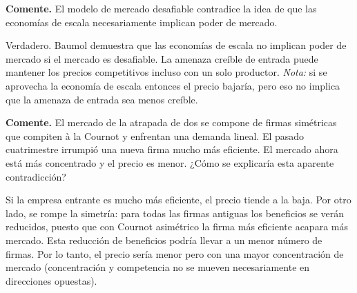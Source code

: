 \question \textbf{Comente.} El modelo de mercado desafiable contradice la idea de que las economías de escala necesariamente implican poder de mercado.
\begin{solution}
Verdadero. Baumol demuestra que las economías de escala no implican poder de mercado si el mercado es desafiable. La amenaza creíble de entrada puede mantener los precios competitivos incluso con un solo productor. \emph{Nota:} si se aprovecha la economía de escala entonces el precio bajaría, pero eso no implica que la amenaza de entrada sea menos creíble.

\end{solution}

\question \textbf{Comente.} El mercado de la atrapada de dos se compone de firmas simétricas que compiten à la Cournot y enfrentan una demanda lineal. El pasado cuatrimestre irrumpió una nueva firma mucho más eficiente. El mercado ahora está más concentrado y el precio es menor. ¿Cómo se explicaría esta aparente contradicción?
\begin{solution}
Si la empresa entrante es mucho más eficiente, el precio tiende a la baja. Por otro lado, se rompe la simetría: para todas las firmas antiguas los beneficios se verán reducidos, puesto que con Cournot asimétrico la firma más eficiente acapara más mercado. Esta reducción de beneficios podría llevar a un menor número de firmas. Por lo tanto, el precio sería menor pero con una mayor concentración de mercado (concentración y competencia no se mueven necesariamente en direcciones opuestas).

\end{solution}

